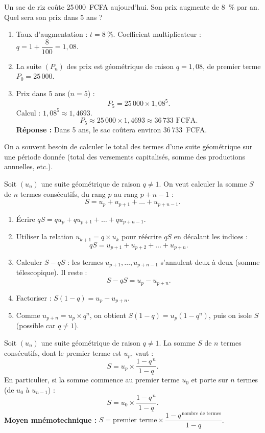 \documentclass[11pt]{article}
\newcounter{popsec}
\newcounter{popsub}
\newcommand{\courssub}[1]{%
  \stepcounter{popsub}%
  \par\vspace{9pt}\noindent{\popxbold\fontsize{11.5}{13}\selectfont\color{popink}{\color{poporange}\thepopsec.\thepopsub}\hspace{6pt}#1}\par\nopagebreak\vspace{4pt}
}
\begin{document}
\begin{exemplebox}
Un sac de riz coûte 25\,000~FCFA aujourd'hui. Son prix augmente de 8~\% par an. Quel sera son prix dans 5 ans ?
\begin{enumerate}
  \item Taux d'augmentation : $t = 8~\%$. Coefficient multiplicateur : $q = 1 + \dfrac{8}{100} = 1,08$.
  \item La suite $(P_n)$ des prix est géométrique de raison $q = 1,08$, de premier terme $P_0 = 25\,000$.
  \item Prix dans 5 ans ($n=5$) :
  \[
  P_5 = 25\,000 \times 1,08^5 .
  \]
  Calcul : $1,08^5 \approx 1,4693$.
  \[
  P_5 \approx 25\,000 \times 1,4693 \approx 36\,733 \text{ FCFA}.
  \]
  \textbf{Réponse :} Dans 5 ans, le sac coûtera environ 36\,733~FCFA.
\end{enumerate}
\end{exemplebox}

\courssub{Somme de termes consécutifs}

On a souvent besoin de calculer le total des termes d'une suite géométrique sur une période donnée (total des versements capitalisés, somme des productions annuelles, etc.).

\begin{experience}
Soit $(u_n)$ une suite géométrique de raison $q \neq 1$. On veut calculer la somme $S$ de $n$ termes consécutifs, du rang $p$ au rang $p+n-1$ :
\[
S = u_p + u_{p+1} + \dots + u_{p+n-1} .
\]
\begin{enumerate}
  \item Écrire $qS = q u_p + q u_{p+1} + \dots + q u_{p+n-1}$.
  \item Utiliser la relation $u_{k+1} = q \times u_k$ pour réécrire $qS$ en décalant les indices :
  \[
  qS = u_{p+1} + u_{p+2} + \dots + u_{p+n} .
  \]
  \item Calculer $S - qS$ : les termes $u_{p+1}, \dots, u_{p+n-1}$ s'annulent deux à deux (somme télescopique). Il reste :
  \[
  S - qS = u_p - u_{p+n} .
  \]
  \item Factoriser : $S(1-q) = u_p - u_{p+n}$.
  \item Comme $u_{p+n} = u_p \times q^n$, on obtient $S(1-q) = u_p (1 - q^n)$, puis on isole $S$ (possible car $q \neq 1$).
\end{enumerate}
\end{experience}

\begin{propriete}
Soit $(u_n)$ une suite géométrique de raison $q \neq 1$. La somme $S$ de $n$ termes consécutifs, dont le premier terme est $u_p$, vaut :
\[
\boxed{S = u_p \times \frac{1 - q^{\,n}}{1 - q}} .
\]
En particulier, si la somme commence au premier terme $u_0$ et porte sur $n$ termes (de $u_0$ à $u_{n-1}$) :
\[
S = u_0 \times \frac{1 - q^{\,n}}{1 - q} .
\]
\textbf{Moyen mnémotechnique :} $S = \text{premier terme} \times \dfrac{1 - q^{\,\text{nombre de termes}}}{1 - q}$.
\end{propriete}
\end{document}
